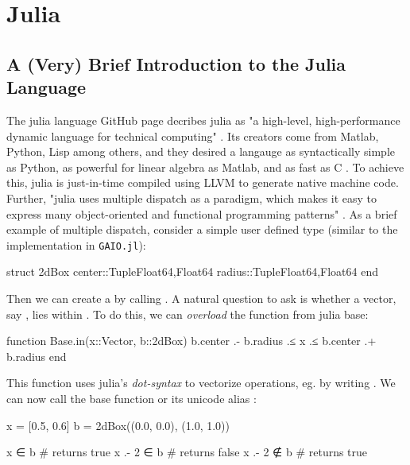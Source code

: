 \section{Julia}


\subsection{A (Very) Brief Introduction to the Julia Language}

The julia language GitHub page decribes julia as "a high-level, high-performance dynamic 
language for technical computing" \cite*{juliarepo}. Its creators come from Matlab, Python,
Lisp among others, and they desired a langauge as syntactically simple as Python, as 
powerful for linear algebra as Matlab, and as fast as C \cite*{julia}. To achieve this,
julia is just-in-time compiled using LLVM to generate native machine code. Further, "julia uses 
multiple dispatch as a paradigm, which makes it easy to express many object-oriented and
functional programming patterns" \cite*{juliamain}. As a brief example of multiple dispatch,
consider a simple user defined type  (similar to the implementation in 
\texttt{GAIO.jl}):

\begin{jllisting}[language=julia, style=jlcodestyle]
    struct 2dBox
        center::Tuple{Float64,Float64}
        radius::Tuple{Float64,Float64}
    end
\end{jllisting}

Then we can create a  by calling . 
A natural question to ask is whether a vector, say , lies within 
. To do this, we can \emph{overload} the function  from julia base:

\begin{jllisting}[language=julia, style=jlcodestyle]
    function Base.in(x::Vector, b::2dBox)
        b.center .- b.radius .≤ x .≤ b.center .+ b.radius
    end
\end{jllisting}

This function uses julia's \emph{dot-syntax} to vectorize operations, eg. \jlinl{+}
by writing . We can now call the base function  or its unicode alias
:

\begin{jllisting}[language=julia, style=jlcodestyle]
    x = [0.5, 0.6]
    b = 2dBox((0.0, 0.0), (1.0, 1.0))

    x ∈ b           # returns true
    x .- 2 ∈ b      # returns false
    x .- 2 ∉ b      # returns true
\end{jllisting}

